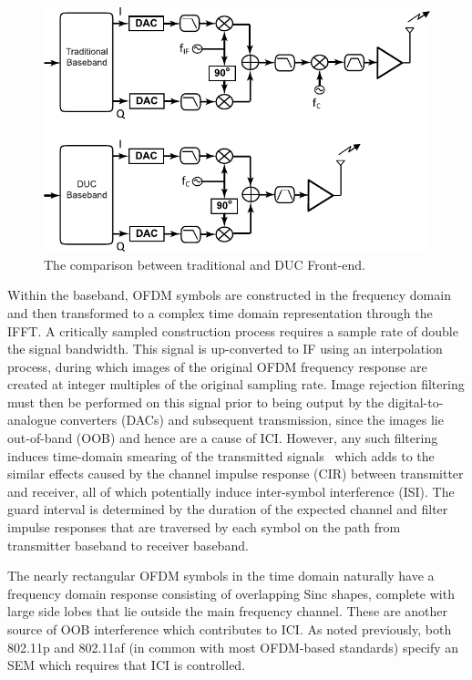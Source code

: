 \begin{figure}
	\centerline{\includegraphics [width=0.7\columnwidth] {figures/DUCFrontEnd.pdf} }
	\caption{The comparison between traditional and DUC Front-end.}
	\label{fig:DUCFrontEnd}
\end{figure}

Within the baseband, OFDM symbols are constructed in the frequency domain and then transformed to a complex time domain representation through the IFFT.
A critically sampled construction process requires a sample rate of double the signal bandwidth.
This signal is up-converted to IF using an interpolation process, during which images of the original OFDM frequency response are created at integer multiples of the original sampling rate.
Image rejection filtering must then be performed on this signal prior to being output by the digital-to-analogue converters (DACs) and subsequent transmission, since the images lie out-of-band (OOB) and hence are a cause of ICI.
However, any such filtering induces time-domain smearing of the transmitted signals~\cite{Faulkner2000} which adds to the similar effects caused by the channel impulse response (CIR) between transmitter and receiver, all of which potentially induce inter-symbol interference (ISI).
The guard interval is determined by the duration of the expected channel and filter impulse responses that are traversed by each symbol on the path from transmitter baseband to receiver baseband.
%

The nearly rectangular OFDM symbols in the time domain naturally have a frequency domain response consisting of overlapping Sinc shapes, complete with large side lobes that lie outside the main frequency channel.
These are another source of OOB interference which contributes to ICI.
As noted previously, both 802.11p and 802.11af (in common with most OFDM-based standards) specify an SEM which requires that ICI is controlled.

